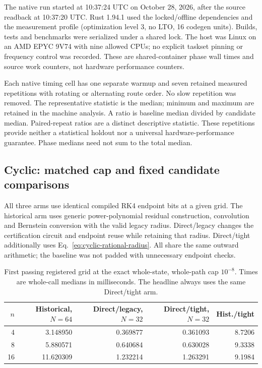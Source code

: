 \documentclass[aps,pra,reprint,onecolumn,10pt,notitlepage,nofootinbib]{revtex4-2}
\begin{document}
The native run started at 10:37:24 UTC on October 28, 2026, after the source
readback at 10:37:20 UTC. Rust 1.94.1 used the locked/offline dependencies and
the measurement profile (optimization level 3, no LTO, 16 codegen units).
Builds, tests and benchmarks were serialized under a shared lock.
The host was Linux on an AMD EPYC 9V74 with nine allowed CPUs; no explicit
taskset pinning or frequency control was recorded. These are shared-container
phase wall times and source work counters, not hardware performance counters.

Each native timing cell has one separate warmup and seven retained measured
repetitions with rotating or alternating route order. No slow repetition was
removed. The representative statistic is the median; minimum and maximum
are retained in the machine analysis. A ratio is baseline median divided by
candidate median. Paired-repeat ratios are a distinct descriptive statistic.
These repetitions provide neither a statistical holdout nor a universal
hardware-performance guarantee. Phase medians need not sum to the total median.

\subsection{Cyclic: matched cap and fixed candidate comparisons}

All three arms use identical compiled RK4 endpoint bits at a given grid.
The historical arm uses generic power-polynomial residual construction,
convolution and Bernstein conversion with the valid legacy radius.
Direct/legacy changes the certification circuit and endpoint reuse while
retaining that radius. Direct/tight additionally uses Eq.~\eqref{eq:cyclic-rational-radius}.
All share the same outward arithmetic; the baseline was not padded with
unnecessary endpoint checks.

\begin{table}[h]
\caption{First passing registered grid at the exact whole-state, whole-path
cap $10^{-8}$. Times are whole-call medians in milliseconds. The headline
always uses the same Direct/tight arm.}
\begin{ruledtabular}
\begin{tabular}{rrrrr}
$n$ & Historical, $N=64$ & Direct/legacy, $N=32$ & Direct/tight, $N=32$ & Hist./tight \\
\hline
4 & 3.148950 & 0.369877 & 0.361093 & 8.7206 \\
8 & 5.880571 & 0.640684 & 0.630028 & 9.3338 \\
16 & 11.620309 & 1.232214 & 1.263291 & 9.1984
\end{tabular}
\end{ruledtabular}
\label{tab:closure-matched}
\end{table}
\end{document}
